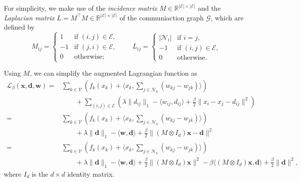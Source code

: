 \documentclass[
  letterpaper,
  DIV=11,
  numbers=noendperiod]{scrartcl}
\theoremstyle{plain}
\theoremstyle{remark}
\begin{document}
For simplicity, we make use of the \emph{incidence matrix}
\(M \in \mathbb{R}^{| \mathcal{E} | \times | \mathcal{E} |}\) and the
\emph{Laplacian matrix}
\(L = M^{\top}M \in \mathbb{R}^{| \mathcal{E} | \times | \mathcal{E} |}\)
of the communiaction graph \(\mathcal{G}\), which are defined by \[
M_{ij} = \begin{cases}
  1 & \text{if } (i, j) \in \mathcal{E}, \\
  -1 & \text{if } (j, i) \in \mathcal{E}, \\
  0 & \text{otherwise};
\end{cases} \qquad
L_{ij} =
\begin{cases}
  | \mathcal{N}_i | & \text{if } i = j, \\
  -1 & \text{if } (i, j) \in \mathcal{E}, \\
  0 & \text{otherwise}.
\end{cases}
\]

Using \(M\), we can simplify the augmented Lagrangian function as \[
\begin{aligned}
  \mathcal{L}_{\beta}(\mathbf{x}, \mathbf{d}, \mathbf{w}) = & \sum_{k \in \mathcal{V}} (f_k(x_k) + \langle x_k, \sum_{j \in \mathcal{N}_k} (w_{kj} - w_{jk}) \rangle ) \\
                                  & \quad \quad + \sum_{(i, j) \in \mathcal{E}} ( \lambda \| d_{ij} \|_1 - \langle w_{ij}, d_{ij} \rangle + \frac{\beta}{2} \| x_i - x_j - d_{ij} \|^2 ) \\
  = & \sum_{k \in \mathcal{V}} (f_k(x_k) + \langle x_k, \sum_{j \in \mathcal{N}_k} (w_{kj} - w_{jk}) \rangle ) \\
  & \quad \quad + \lambda \| \mathbf{d} \|_1 - \langle \mathbf{w}, \mathbf{d} \rangle + \frac{\beta}{2} \| (M \otimes I_d) \mathbf{x} - \mathbf{d} \|^2 \\
  = & \sum_{k \in \mathcal{V}} (f_k(x_k) + \langle x_k, \sum_{j \in \mathcal{N}_k} (w_{kj} - w_{jk}) \rangle) \\
  & \quad \quad + \lambda \| \mathbf{d} \|_1 - \langle \mathbf{w}, \mathbf{d} \rangle + \frac{\beta}{2} \| (M \otimes I_d) \mathbf{x} \|^2 - \beta \langle (M \otimes I_d) \mathbf{x}, \mathbf{d} \rangle + \frac{\beta}{2} \| \mathbf{d} \|^2,
\end{aligned}
\] where \(I_d\) is the \(d \times d\) identity matrix.
\end{document}
